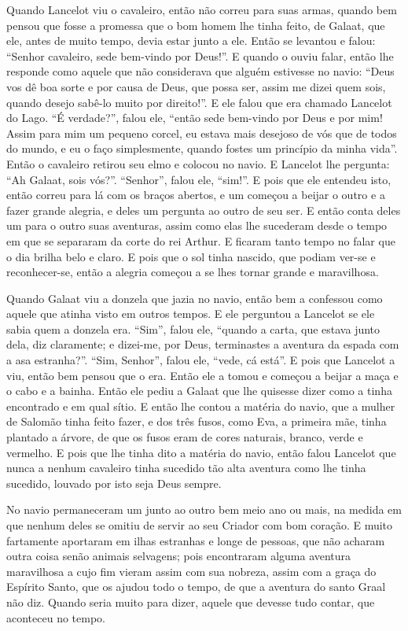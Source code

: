 Quando Lancelot viu o cavaleiro, então não correu para suas armas, quando bem
pensou que fosse a promessa que o bom homem lhe tinha feito, de Galaat, que
ele, antes de muito tempo, devia estar junto a ele. Então se levantou e falou:
“Senhor cavaleiro, sede bem-vindo por Deus!”. E quando o ouviu falar, então lhe
responde como aquele que não considerava que alguém estivesse no navio: “Deus
vos dê boa sorte e por causa de Deus, que possa ser, assim me dizei quem sois,
quando desejo sabê-lo muito por direito!”. E ele falou que era chamado
Lancelot do Lago. “É verdade?”, falou ele, “então sede bem-vindo por Deus e
por mim! Assim para mim um pequeno corcel, eu estava mais desejoso de vós que
de todos do mundo, e eu o faço simplesmente, quando fostes um princípio da
minha vida”. Então o cavaleiro retirou seu elmo e colocou no navio. E Lancelot
lhe pergunta: “Ah Galaat, sois vós?”. “Senhor”, falou ele, “sim!”. E pois que
ele entendeu isto, então correu para lá com os braços abertos, e um começou a
beijar o outro e a fazer grande alegria, e deles um pergunta ao outro de seu
ser. E então conta deles um para o outro suas aventuras, assim como elas lhe
sucederam desde o tempo em que se separaram da corte do rei Arthur. E ficaram
tanto tempo no falar que o dia brilha belo e claro. E pois que o sol tinha
nascido, que podiam ver-se e reconhecer-se, então a alegria começou a se lhes
tornar grande e maravilhosa.

Quando Galaat viu a donzela que jazia no navio, então bem a confessou como
aquele que atinha visto em outros tempos. E ele perguntou a Lancelot se ele
sabia quem a donzela era. “Sim”, falou ele, “quando a carta, que estava junto
dela, diz claramente; e dizei-me, por Deus, terminastes a aventura da espada
com a asa estranha?”. “Sim, Senhor”, falou ele, “vede, cá está”. E pois que
Lancelot a viu, então bem pensou que o era. Então ele a tomou e começou a
beijar a maça e o cabo e a bainha. Então ele pediu a Galaat que lhe quisesse
dizer como a tinha encontrado e em qual sítio. E então lhe contou a matéria do
navio, que a mulher de Salomão tinha feito fazer, e dos três fusos, como Eva, a
primeira mãe, tinha plantado a árvore, de que os fusos eram de cores naturais,
branco, verde e vermelho. E pois que lhe tinha dito a matéria do navio, então
falou Lancelot que nunca a nenhum cavaleiro tinha sucedido tão alta aventura
como lhe tinha sucedido, louvado por isto seja Deus sempre. 

No navio permaneceram um junto ao outro bem meio ano ou mais, na medida em que
nenhum deles se omitiu de servir ao seu Criador com bom coração. E muito
fartamente aportaram em ilhas estranhas e longe de pessoas, que não acharam
outra coisa senão animais selvagens; pois encontraram alguma aventura
maravilhosa a cujo fim vieram assim com sua nobreza, assim com a graça do
Espírito Santo, que os ajudou todo o tempo, de que a aventura do santo Graal
não diz. Quando seria muito para dizer, aquele que devesse tudo contar, que
aconteceu no tempo. 

